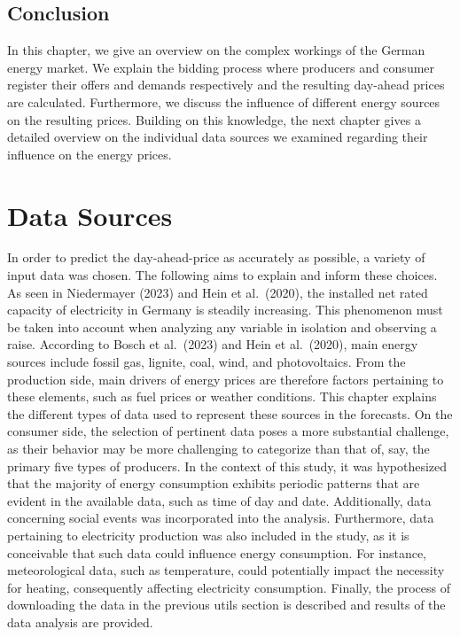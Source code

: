 \documentclass[a4paper]{article}
\begin{document}
\subsection{Conclusion}\label{conclusion}

In this chapter, we give an overview on the complex workings of the
German energy market. We explain the bidding process where producers and
consumer register their offers and demands respectively and the
resulting day-ahead prices are calculated. Furthermore, we discuss the
influence of different energy sources on the resulting prices. Building
on this knowledge, the next chapter gives a detailed overview on the
individual data sources we examined regarding their influence on the
energy prices.

    \section{Data Sources}\label{data-sources}

In order to predict the day-ahead-price as accurately as possible, a
variety of input data was chosen. The following aims to explain and
inform these choices. As seen in Niedermayer (2023) and Hein et
al.~(2020), the installed net rated capacity of electricity in Germany
is steadily increasing. This phenomenon must be taken into account when
analyzing any variable in isolation and observing a raise. According to
Bosch et al.~(2023) and Hein et al.~(2020), main energy sources include
fossil gas, lignite, coal, wind, and photovoltaics. From the production
side, main drivers of energy prices are therefore factors pertaining to
these elements, such as fuel prices or weather conditions. This chapter
explains the different types of data used to represent these sources in
the forecasts. On the consumer side, the selection of pertinent data
poses a more substantial challenge, as their behavior may be more
challenging to categorize than that of, say, the primary five types of
producers. In the context of this study, it was hypothesized that the
majority of energy consumption exhibits periodic patterns that are
evident in the available data, such as time of day and date.
Additionally, data concerning social events was incorporated into the
analysis. Furthermore, data pertaining to electricity production was
also included in the study, as it is conceivable that such data could
influence energy consumption. For instance, meteorological data, such as
temperature, could potentially impact the necessity for heating,
consequently affecting electricity consumption. Finally, the process of
downloading the data in the previous utils section is described and
results of the data analysis are provided.
\end{document}
